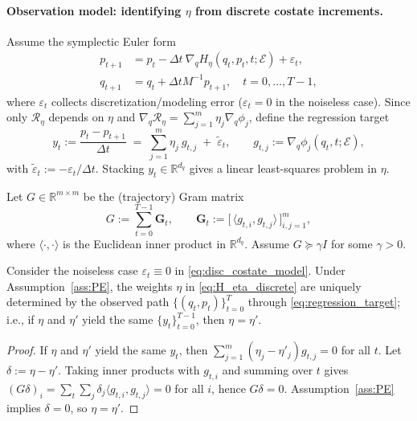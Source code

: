 \paragraph{Observation model: identifying $\eta$ from discrete costate increments.}
Assume the symplectic Euler form
\begin{equation}
\begin{aligned}
\label{eq:disc_costate_model}
p_{t+1}&=p_t-\Delta t~\nabla_q H_\eta(q_t,p_t,t;\mathcal E)+\varepsilon_t, \\
q_{t+1}&= q_t + \Delta t M^{-1} p_{t+1},\quad t=0,\dots,T-1, 
\end{aligned}
\end{equation}
where $\varepsilon_t$ collects discretization/modeling error ($\varepsilon_t=0$ in the noiseless case).
Since only $\mathcal R_\eta$ depends on $\eta$ and $\nabla_q \mathcal R_\eta=\sum_{j=1}^m \eta_j \nabla_q\phi_j$,
define the regression target
\begin{equation}
\label{eq:regression_target}
y_t
:=\frac{p_t-p_{t+1}}{\Delta t}\;=\;\sum_{j=1}^m \eta_j~g_{t,j}\;+\;\tilde\varepsilon_t,
\qquad
g_{t,j}:=\nabla_q\phi_j(q_t,t;\mathcal E),
\end{equation}
with $\tilde\varepsilon_t:=-\varepsilon_t/\Delta t$.
Stacking $y_t\in\mathbb R^{d_q}$ gives a linear least-squares problem in $\eta$.

\begin{assumption}
\label{ass:PE}
Let $G\in\mathbb R^{m\times m}$ be the (trajectory) Gram matrix
\[
G:=\sum_{t=0}^{T-1} \mathbf G_t,\qquad
\mathbf G_t:=\Big[\,\langle g_{t,i},g_{t,j}\rangle\,\Big]_{i,j=1}^m,
\]
where $\langle\cdot,\cdot\rangle$ is the Euclidean inner product in $\mathbb R^{d_q}$.
Assume $G\succeq \gamma I$ for some $\gamma>0$.
\end{assumption}

\begin{theorem}
\label{thm:identifiability_discrete}
Consider the noiseless case $\varepsilon_t\equiv 0$ in \cref{eq:disc_costate_model}.
Under Assumption~\ref{ass:PE}, the weights $\eta$ in \cref{eq:H_eta_discrete} are uniquely determined by the observed path
$\{(q_t,p_t)\}_{t=0}^{T}$ through \cref{eq:regression_target}; i.e., if $\eta$ and $\eta'$ yield the same
$\{y_t\}_{t=0}^{T-1}$, then $\eta=\eta'$.
\end{theorem}

\begin{proof}
If $\eta$ and $\eta'$ yield the same $y_t$, then $\sum_{j=1}^m(\eta_j-\eta'_j)g_{t,j}=0$ for all $t$.
Let $\delta:=\eta-\eta'$. Taking inner products with $g_{t,i}$ and summing over $t$ gives
$(G\delta)_i=\sum_{t}\sum_{j}\delta_j\langle g_{t,i},g_{t,j}\rangle=0$ for all $i$, hence $G\delta=0$.
Assumption~\ref{ass:PE} implies $\delta=0$, so $\eta=\eta'$.
\end{proof}

